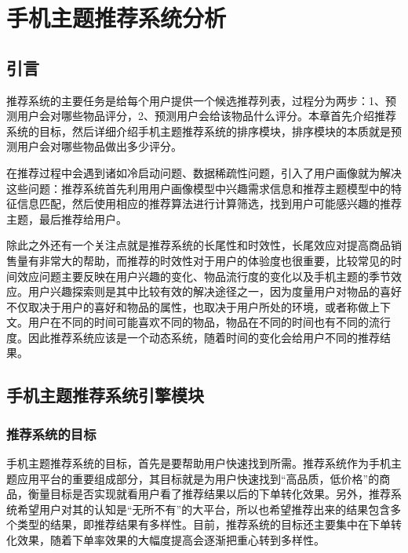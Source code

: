 \chapter{手机主题推荐系统分析}

	\section{引言}
		推荐系统的主要任务是给每个用户提供一个候选推荐列表，过程分为两步：1、预测用户会对哪些物品评分，2、预测用户会给该物品什么评分。本章首先介绍推荐系统的目标，然后详细介绍手机主题推荐系统的排序模块，排序模块的本质就是预测用户会对哪些物品做出多少评分。
		
		在推荐过程中会遇到诸如冷启动问题、数据稀疏性问题，引入了用户画像就为解决这些问题：推荐系统首先利用用户画像模型中兴趣需求信息和推荐主题模型中的特征信息匹配，然后使用相应的推荐算法进行计算筛选，找到用户可能感兴趣的推荐主题，最后推荐给用户。

		除此之外还有一个关注点就是推荐系统的长尾性和时效性，长尾效应对提高商品销售量有非常大的帮助，而推荐的时效性对于用户的体验度也很重要，比较常见的时间效应问题主要反映在用户兴趣的变化、物品流行度的变化以及手机主题的季节效应。用户兴趣探索则是其中比较有效的解决途径之一，因为度量用户对物品的喜好不仅取决于用户的喜好和物品的属性，也取决于用户所处的环境，或者称做上下文。用户在不同的时间可能喜欢不同的物品，物品在不同的时间也有不同的流行度。因此推荐系统应该是一个动态系统，随着时间的变化会给用户不同的推荐结果\citep{temporal-cf}。

	\section{手机主题推荐系统引擎模块}
		\subsection{推荐系统的目标}
		手机主题推荐系统的目标，首先是要帮助用户快速找到所需。推荐系统作为手机主题应用平台的重要组成部分，其目标就是为用户快速找到“高品质，低价格”的商品，衡量目标是否实现就看用户看了推荐结果以后的下单转化效果。另外，推荐系统希望用户对其的认知是“无所不有”的大平台，所以也希望推荐出来的结果包含多个类型的结果，即推荐结果有多样性。目前，推荐系统的目标还主要集中在下单转化效果，随着下单率效果的大幅度提高会逐渐把重心转到多样性。
